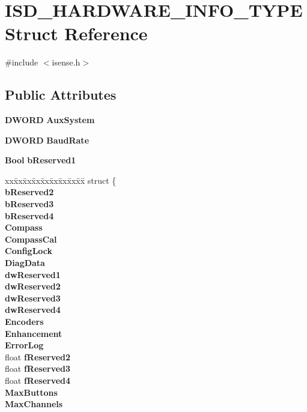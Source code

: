 \section{\-I\-S\-D\-\_\-\-H\-A\-R\-D\-W\-A\-R\-E\-\_\-\-I\-N\-F\-O\-\_\-\-T\-Y\-P\-E \-Struct \-Reference}
\label{structISD__HARDWARE__INFO__TYPE}


{\ttfamily \#include $<$isense.\-h$>$}

\subsection*{\-Public \-Attributes}
\begin{DoxyCompactItemize}
\item 
{\bf \-D\-W\-O\-R\-D} {\bf \-Aux\-System}
\item 
{\bf \-D\-W\-O\-R\-D} {\bf \-Baud\-Rate}
\item 
{\bf \-Bool} {\bf b\-Reserved1}
\item 
\begin{tabbing}
xx\=xx\=xx\=xx\=xx\=xx\=xx\=xx\=xx\=\kill
struct \{\\
 {\bf bReserved2}\\
 {\bf bReserved3}\\
 {\bf bReserved4}\\
 {\bf Compass}\\
 {\bf CompassCal}\\
 {\bf ConfigLock}\\
 {\bf DiagData}\\
 {\bf dwReserved1}\\
 {\bf dwReserved2}\\
 {\bf dwReserved3}\\
 {\bf dwReserved4}\\
 {\bf Encoders}\\
 {\bf Enhancement}\\
 {\bf ErrorLog}\\
\>float {\bf fReserved2}\\
\>float {\bf fReserved3}\\
\>float {\bf fReserved4}\\
 {\bf MaxButtons}\\
 {\bf MaxChannels}\\

\end{tabbing}
\end{DoxyCompactItemize}
